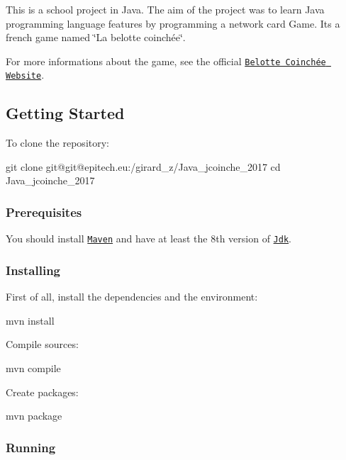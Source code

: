 This is a school project in Java. The aim of the project was to learn Java programming language features by programming a network card Game. It\textquotesingle{}s a french game named \char`\"{}\+La belotte coinchée\char`\"{}.

For more informations about the game, see the official \href{http://www.beloteweb.eu/regles-de-la-belote-coinchee/}{\tt Belotte Coinchée Website}.

\subsection*{Getting Started}

To clone the repository\+: 
\begin{DoxyCode}
git clone git@git@epitech.eu:/girard\_z/Java\_jcoinche\_2017
cd Java\_jcoinche\_2017
\end{DoxyCode}


\subsubsection*{Prerequisites}

You should install \href{https://maven.apache.org/plugins/maven-compiler-plugin/index.html}{\tt Maven} and have at least the 8th version of \href{http://www.oracle.com/technetwork/java/javase/downloads/jdk8-downloads-2133151.html}{\tt Jdk}.

\subsubsection*{Installing}

First of all, install the dependencies and the environment\+:


\begin{DoxyCode}
mvn install
\end{DoxyCode}


Compile sources\+:


\begin{DoxyCode}
mvn compile
\end{DoxyCode}


Create packages\+: 
\begin{DoxyCode}
mvn package
\end{DoxyCode}


\subsubsection*{Running}


